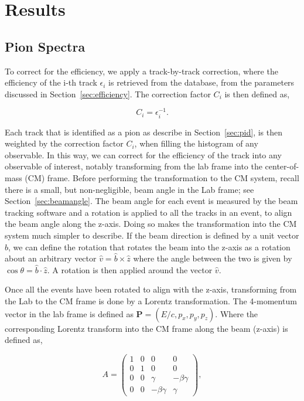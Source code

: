 \chapter{Results}
 
\section{Pion Spectra}
\label{sec:pionSpectra}

To correct for the efficiency, we apply a track-by-track correction, where the efficiency of the i-th track $\epsilon_i$ is retrieved from the database, from the parameters discussed in Section~\ref{sec:efficiency}. The correction factor $C_i$ is then defined as,

\begin{equation}
C_i = \epsilon_i^{-1}.
\end{equation}

Each track that is identified as a pion as describe in Section~\ref{sec:pid}, is then weighted by the correction factor $C_i$, when filling the histogram of any observable. In this way, we can correct for the efficiency of the track into any observable of interest, notably transforming from the lab frame into the center-of-mass (CM) frame. Before performing the transformation to the CM system, recall there is a small, but non-negligible, beam angle in the Lab frame; see Section~\ref{sec:beamangle}. The beam angle for each event is measured by the beam tracking software and a rotation is applied to all the tracks in an event, to align the beam angle along the z-axis. Doing so makes the transformation into the CM system much simpler to describe. If the beam direction is defined by a unit vector $\hat{b}$, we can define the rotation that rotates the beam into the z-axis as a rotation about an arbitrary vector $\hat{v} = \hat{b}\times\hat{z}$ where the angle between the two is given by $\cos \theta = \hat{b}\cdot\hat{z}$. A rotation is then applied around the vector $\hat{v}$.

Once all the events have been rotated to align with the z-axis, transforming from the Lab to the CM frame is done by a Lorentz transformation. The 4-momentum vector in the lab frame is defined as $\textbf{P} = (E/c,p_x,p_y,p_z)$. Where the corresponding Lorentz transform into the CM frame along the beam (z-axis) is defined as,

\begin{equation}
A = \begin{pmatrix}
1 & 0 & 0 & 0\\
0 & 1 & 0 & 0\\
0 & 0 & \gamma & -\beta \gamma\\
0 & 0 & -\beta \gamma & \gamma
\end{pmatrix},
\end{equation}

